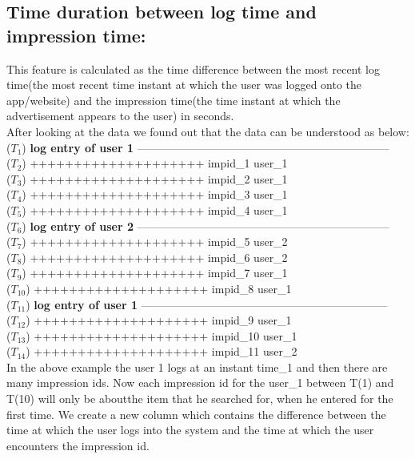 \documentclass{scrreprt}
\begin{document}
\subsection{Time duration between log time and impression time:}
This feature is calculated as the time difference between the most recent log time(the most recent time instant at which the user was logged onto the app/website) and the impression time(the time instant at which the advertisement appears to the user) in seconds. \\
After looking at the data we found out that the data can be understood as below: \\
($T_1$) \textbf{log entry of user 1} --------------------------------------------------------------------\\
($T_2$)		\qquad	++++++++++++++++++++ \qquad impid_1 user_1 \\
($T_3$)		\qquad	++++++++++++++++++++ \qquad impid_2 user_1 \\
($T_4$)		\qquad	++++++++++++++++++++ \qquad impid_3 user_1 \\
($T_5$)		\qquad	++++++++++++++++++++ \qquad impid_4 user_1 \\
($T_6$) \textbf{log entry of user 2} --------------------------------------------------------------------\\
($T_7$)		\qquad	++++++++++++++++++++ \qquad impid_5 user_2 \\
($T_8$)		\qquad	++++++++++++++++++++ \qquad impid_6 user_2 \\
($T_9$)		\qquad	++++++++++++++++++++ \qquad impid_7 user_1 \\
($T_{10}$)	\qquad  ++++++++++++++++++++ \qquad impid_8 user_1 \\
($T_{11}$) \textbf{log entry of user 1} ------------------------------------------------------------------\\
($T_{12}$)	\qquad  ++++++++++++++++++++ \qquad impid_9 user_1 \\
($T_{13}$)	\qquad	++++++++++++++++++++ \qquad impid_10 user_1 \\
($T_{14}$)	\qquad	++++++++++++++++++++ \qquad impid_11 user_2 \\


In the above example the user 1 logs at an instant time_1 and then there are many impression ids. Now each impression id for the user_1 between T(1) and T(10) will only be aboutthe item that he searched for, when he entered for the first time. We create a new column which contains the difference between the time at which the user logs into the system and the time at which the user encounters the impression id.
\end{document}
